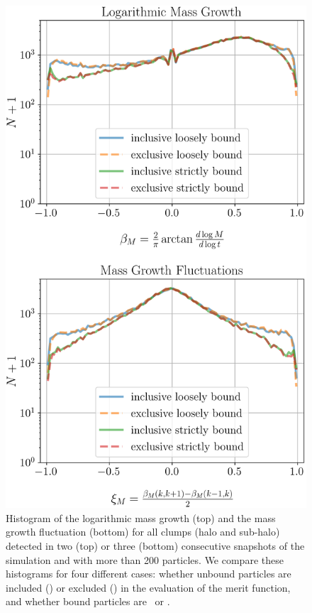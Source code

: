 \begin{figure}
  \centering
  \includegraphics[width=.9\linewidth, keepaspectratio]{images/tree-statistics-my-threshold/mass-statistics-inc-excl.png}%
  \caption{Histogram of the logarithmic mass growth (top) and the mass
    growth fluctuation (bottom) for all clumps (halo and sub-halo)
    detected in two (top) or three (bottom) consecutive snapshots of
    the simulation and with more than 200 particles. We compare these
    histograms for four different cases: whether unbound particles are
    included (\inc) or excluded (\exc) in the evaluation of the merit
    function, and whether bound particles are \nosad\ or \sad.
  }%
  \label{fig:saddle_nosaddle_masses}
\end{figure}



